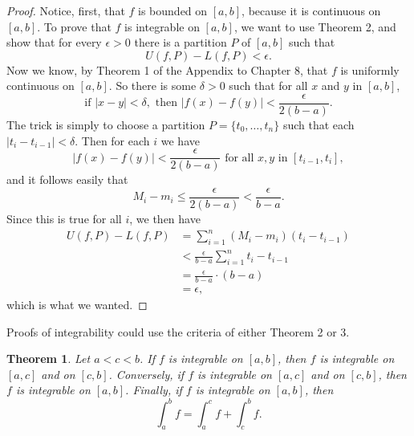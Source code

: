 \documentclass{article}
\newtheorem{theorem}{Theorem}
\begin{document}
\begin{proof}
  Notice, first, that $f$ is bounded on $[a, b]$, because it is continuous on
  $[a, b]$. To prove that $f$ is integrable on $[a, b]$, we want to use Theorem
  2, and show that for every $\epsilon > 0$ there is a partition $P$ of $[a,
  b]$ such that \begin{equation*}
    U(f, P) - L(f, P) < \epsilon.
  \end{equation*} Now we know, by Theorem 1 of the Appendix to Chapter 8, that
  $f$ is uniformly continuous on $[a, b]$. So there is some $\delta > 0$ such
  that for all $x$ and $y$ in $[a, b]$, \begin{equation*}
    \text{if } |x - y| < \delta, \text{ then } |f(x) - f(y)| <
      \frac{\epsilon}{2(b - a)}.
  \end{equation*} The trick is simply to choose a partition $P = \{t_0, \ldots,
  t_n\}$ such that each $|t_i - t_{i - 1}| < \delta$. Then for each $i$ we
  have \begin{equation*}
    |f(x) - f(y)| < \frac{\epsilon}{2(b - a)} \text{ for all } x, y \text{ in }
      [t_{i - 1}, t_i],
  \end{equation*} and it follows easily that \begin{equation*}
    M_i - m_i \leq \frac{\epsilon}{2(b - a)} < \frac{\epsilon}{b - a}.
  \end{equation*} Since this is true for all $i$, we then have
  \begin{align*}
    U(f, P) - L(f, P) &= \sum_{i = 1}^n (M_i - m_i)(t_i - t_{i - 1}) \\
      &< \frac{\epsilon}{b - a}\sum_{i = 1}^n t_i - t_{i - 1} \\
      &= \frac{\epsilon}{b - a} \cdot (b - a) \\
      &= \epsilon,
  \end{align*} which is what we wanted.
\end{proof}

Proofs of integrability could use the criteria of either Theorem 2 or 3.

\begin{theorem}
  Let $a < c < b$. If $f$ is integrable on $[a, b]$, then $f$ is integrable on
  $[a, c]$ and on $[c, b]$. Conversely, if $f$ is integrable on $[a, c]$ and on
  $[c, b]$, then $f$ is integrable on $[a, b]$. Finally, if $f$ is integrable
  on $[a, b]$, then \begin{equation*}
    \int_a^b f = \int_a^c f + \int_c^b f.
  \end{equation*}
\end{theorem}
\end{document}
